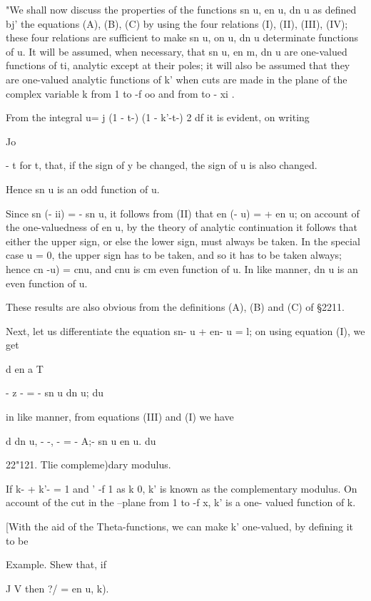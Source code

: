 "We shall now discuss the properties of the functions sn u, en u, dn u
as defined bj' the equations (A), (B), (C) by using the four relations
(I), (II), (III), (IV); these four relations are sufficient to make
sn u, on u, dn u determinate functions of u. It will be assumed, when
necessary, that sn u, en m, dn u are one-valued functions of ti,
analytic except at their poles; it will also be assumed that they are
one-valued analytic functions of k' when cuts are made in the plane of
the complex variable k from 1 to -f oo and from to - xi .


From the integral u= j (1 - t-) (1 - k'-t-) 2 df it is evident, on
writing

Jo

- t for t, that, if the sign of y be changed, the sign of u is also
changed.

Hence sn u is an odd function of u.

Since sn (- ii) = - sn u, it follows from (II) that en (- u) = + en u;
on account of the one-valuedness of en u, by the theory of analytic
continuation it follows that either the upper sign, or else the lower
sign, must always be taken. In the special case u = 0, the upper sign
has to be taken, and so it has to be taken always; hence cn -u) = cnu,
and cnu is cm even function of u. In like manner, dn u is an even
function of u.

These results are also obvious from the definitions (A), (B) and (C)
of §2211.

Next, let us differentiate the equation sn- u + en- u = l; on using
equation (I), we get

d en a T

- z - = - sn u dn u; du

in like manner, from equations (III) and (I) we have

d dn u, - -, - = - A;- sn u en u. du

22"121. Tlie compleme)dary modulus.

If k- + k'- = 1 and ' -f 1 as k 0, k' is known as the complementary
modulus. On account of the cut in the --plane from 1 to -f x, k' is a
one- valued function of k.

[With the aid of the Theta-functions, we can make k' one-valued, by
defining it to be

Example. Shew that, if

J V then ?/ = en u, k).

%
%

